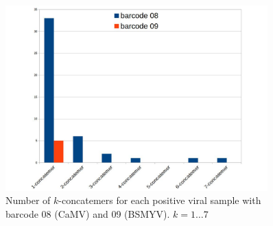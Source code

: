 \begin{figure}[!ht]
\centerline{\includegraphics[width=0.9\textwidth]{images/concat_count.jpg}}
\caption[Concatemer reads count]{Number of $k$-concatemers for each positive viral sample with barcode 08 (CaMV) and 09 (BSMYV). $k=1\dots 7$}
\label{supp_fig:concat_count}
\end{figure}

